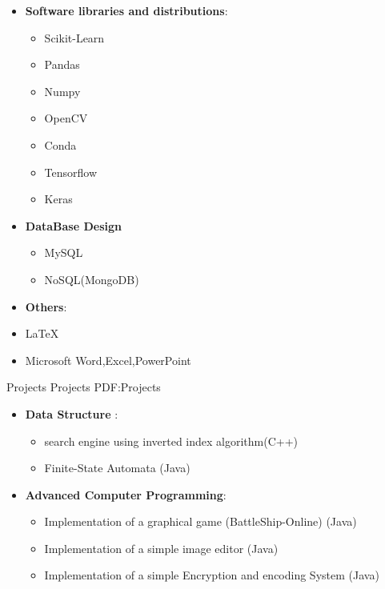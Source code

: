 \documentclass[letterpaper,MMMyyyy,nonstopmode]{simpleresumecv}
\begin{document}
\begin{Body}
\begin{itemize}
    \item \textbf{ Software libraries and distributions}: 
    \begin{itemize}
        \item Scikit-Learn
        \item Pandas
        \item Numpy
        \item OpenCV
        \item Conda
        \item Tensorflow
        \item Keras
    \end{itemize}
     


\item \textbf {DataBase Design}
\begin{itemize}
     \item MySQL
     \item NoSQL(MongoDB)

\end{itemize}


 \item \textbf{Others}: 
\item{\LaTeX}
\item Microsoft Word,Excel,PowerPoint

\end{itemize}







\Section
{Projects}
{Projects}
{PDF:Projects}

\Entry
\begin{itemize}
	\item \textbf{Data Structure} :
		\begin{itemize}
		\item	search engine using inverted index algorithm(C++)
	     \item   Finite-State Automata (Java)
		\end{itemize}
		
	\item \textbf{Advanced Computer Programming}:
		\begin{itemize}
		\item  Implementation of a graphical game (BattleShip-Online) (Java)
     	\item Implementation of a simple image editor (Java)
	    \item Implementation of a simple Encryption and encoding System  (Java)
		\end{itemize}
		

\end{itemize}
\end{Body}
\end{document}
